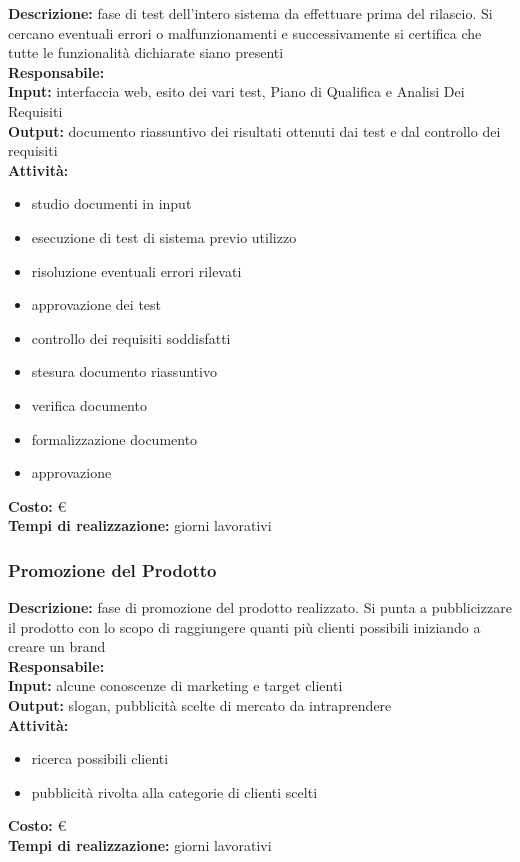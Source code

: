 \textbf{Descrizione:} fase di test dell’intero sistema da effettuare prima del rilascio. Si cercano
eventuali errori o malfunzionamenti e successivamente si certifica che tutte le funzionalità dichiarate siano presenti \\
\linebreak
\textbf{Responsabile:} \\
\linebreak
\textbf{Input:} interfaccia web, esito dei vari test, Piano di Qualifica e Analisi Dei Requisiti \\
\linebreak
\textbf{Output:} documento riassuntivo dei risultati ottenuti dai test e dal controllo dei requisiti \\
\linebreak
\textbf{Attività:}
\begin{itemize}
\item studio documenti in input
\item esecuzione di test di sistema previo utilizzo
\item risoluzione eventuali errori rilevati
\item approvazione dei test
\item controllo dei requisiti soddisfatti
\item stesura documento riassuntivo
\item verifica documento
\item formalizzazione documento
\item approvazione
\end{itemize}
\textbf{Costo:} \euro \\
\textbf{Tempi di realizzazione:}  giorni lavorativi


 \subsubsection{Promozione del Prodotto}
\textbf{Descrizione:} fase di promozione del prodotto realizzato. Si punta a pubblicizzare il
prodotto con lo scopo di raggiungere quanti più clienti possibili iniziando a creare un brand \\
\linebreak
\textbf{Responsabile:} \\
\linebreak
\textbf{Input:} alcune conoscenze di marketing e target clienti \\
\linebreak
\textbf{Output:} slogan, pubblicità scelte di mercato da intraprendere \\
\linebreak
\textbf{Attività:}
\begin{itemize}
\item ricerca possibili clienti
\item pubblicità rivolta alla categorie di clienti scelti
\end{itemize}
\textbf{Costo:} \euro \\
\textbf{Tempi di realizzazione:}  giorni lavorativi


